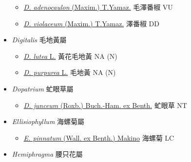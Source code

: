 \begin{itemize}
  \begin{itemize}
        \item[] \href{http://www.theplantlist.org/tpl1.1/search?q=Deinostema+adenocaulon}{\textit{D. adenocaulon} (Maxim.) T.Yamaz.}   毛澤番椒   VU
        \item[] \href{http://www.theplantlist.org/tpl1.1/search?q=Deinostema+violaceum}{\textit{D. violaceum} (Maxim.) T.Yamaz.}   澤番椒   DD
  \end{itemize}
 \item[] \textit{Digitalis} 毛地黃屬
                                
  \begin{itemize}
        \item[] \href{http://www.theplantlist.org/tpl1.1/search?q=Digitalis+lutea}{\textit{D. lutea} L.}   黃花毛地黃   NA (N)
        \item[] \href{http://www.theplantlist.org/tpl1.1/search?q=Digitalis+purpurea}{\textit{D. purpurea} L.}   毛地黃   NA (N)
  \end{itemize}
 \item[] \textit{Dopatrium} 虻眼草屬
                                
  \begin{itemize}
        \item[] \href{http://www.theplantlist.org/tpl1.1/search?q=Dopatrium+junceum}{\textit{D. junceum} (Roxb.) Buch.-Ham. ex Benth.}   虻眼草   NT
  \end{itemize}
 \item[] \textit{Ellisiophyllum} 海螺菊屬
                                
  \begin{itemize}
        \item[] \href{http://www.theplantlist.org/tpl1.1/search?q=Ellisiophyllum+pinnatum}{\textit{E. pinnatum} (Wall. ex Benth.) Makino}   海螺菊   LC
  \end{itemize}
 \item[] \textit{Hemiphragma} 腰只花屬
                                

\end{itemize}
